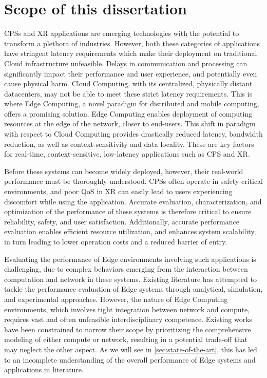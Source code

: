 \section{Scope of this dissertation}
\glsresetall%

\glspl{CPS} and \gls{XR} applications are emerging technologies with the potential to transform a plethora of industries.
However, both these categories of applications have stringent latency requirements which make their deployment on traditional Cloud infrastructure unfeasible.
Delays in communication and processing can significantly impact their performance and user experience, and potentially even cause physical harm.
Cloud Computing, with its centralized, physically distant datacenters, may not be able to meet these strict latency requirements.
This is where Edge Computing, a novel paradigm for distributed and mobile computing, offers a promising solution.
Edge Computing enables deployment of computing resources at the edge of the network, closer to end-users.
This shift in paradigm with respect to Cloud Computing provides drastically reduced latency, bandwidth reduction, as well as context-sensitivity and data locality.
These are key factors for real-time, context-sensitive, low-latency applications such as \gls{CPS} and \gls{XR}.

Before these systems can become widely deployed, however, their real-world performance must be thoroughly understood.
\glspl{CPS} often operate in safety-critical environments, and poor \gls{QoS} in \gls{XR} can easily lead to users experiencing discomfort while using the application.
Accurate evaluation, characterization, and optimization of the performance of these systems is therefore critical to ensure reliability, safety, and user satisfaction.
Additionally, accurate performance evaluation enables efficient resource utilization, and enhances system scalability, in turn leading to lower operation costs and a reduced barrier of entry.

Evaluating the performance of Edge environments involving such applications is challenging, due to complex behaviors emerging from the interaction between computation and network in these systems.
Existing literature has attempted to tackle the performance evaluation of Edge systems through analytical, simulation, and experimental approaches.
However, the nature of Edge Computing environments, which involves tight integration between network and compute, requires vast and often unfeasible interdisciplinary competence.
Existing works have been constrained to narrow their scope by prioritizing the comprehensive modeling of either compute or network, resulting in a potential trade-off that may neglect the other aspect.
As we will see in \cref{sec:state-of-the-art}, this has led to an incomplete understanding of the overall performance of Edge systems and applications in literature.

